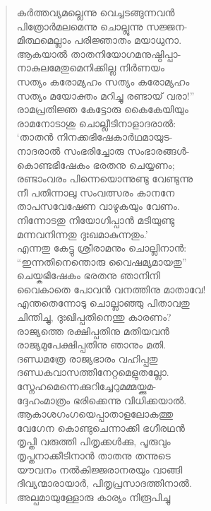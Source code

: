 \begin{verse}
കര്‍ത്തവ്യമല്ലെന്നു വെച്ചടങ്ങുന്നവന്‍\\
പിത്രോര്‍മലമെന്നു ചൊല്ലുന്നു സജ്ജന-\\
മിത്ഥമെല്ലാം പരിജ്ഞാതം മയാധുനാ.\\
ആകയാല്‍ താതനിയോഗമനുഷ്ഠിപ്പാ-\\
നാകുലമേതുമെനിക്കില്ല നിര്‍ണയം\\
സത്യം കരോമ്യഹം സത്യം കരോമ്യഹം\\
സത്യം മയോക്തം മറിച്ചു രണ്ടായ് വരാ!”\\
രാമപ്രതിജ്ഞ കേട്ടോരു കൈകേയിയും\\
രാമനോടാശു ചൊല്ലീടിനാളാദരാല്‍:\\
‘താതന്‍ നിനക്കഭിഷേകാര്‍ഥമായുട-\\
നാദരാല്‍ സംഭരിച്ചോരു സംഭാരങ്ങള്‍-\\
കൊണ്ടഭിഷേകം ഭരതനു ചെയ്യണം;\\
രണ്ടാംവരം പിന്നെയൊന്നുണ്ടു വേണ്ടുന്നു\\
നീ പതിന്നാലു സംവത്സരം കാനനേ\\
താപസവേഷേണ വാഴുകയും വേണം.\\
നിന്നോടതു നിയോഗിപ്പാന്‍ മടിയുണ്ടു\\
മന്നവനിന്നതു ദുഃഖമാകുന്നതും.’\\
എന്നതു കേട്ടു ശ്രീരാമനും ചൊല്ലിനാന്‍:\\
“ഇന്നതിനെന്തൊരു വൈഷമ്യമായതു”\\
ചെയ്കഭിഷേകം ഭരതനു ഞാനിനി\\
വൈകാതെ പോവന്‍ വനത്തിനു മാതാവേ!\\
എന്തതെന്നോടു ചൊല്ലാഞ്ഞു പിതാവതു\\
ചിന്തിച്ചു, ദുഃഖിപ്പതിനെന്തു കാരണം?\\
രാജ്യത്തെ രക്ഷിപ്പതിനു മതിയവന്‍\\
രാജ്യമുപേക്ഷിപ്പതിനു ഞാനും മതി.\\
ദണ്ഡമത്രേ രാജ്യഭാരം വഹിപ്പതു\\
ദണ്ഡകവാസത്തിനേറ്റമെളുതല്ലോ.\\
സ്നേഹമെന്നെക്കുറിച്ചേറുമമ്മയ്ക്കുമ-\\
ദ്ദേഹംമാത്രം ഭരിക്കെന്നു വിധിക്കയാല്‍.\\
ആകാശഗംഗയെപ്പാതാളലോകത്തു\\
വേഗേന കൊണ്ടുചെന്നാക്കി ഭഗീരഥന്‍\\
തൃപ്തി വരുത്തി പിതൃക്കള്‍ക്കു, പൂരുവും\\
തൃപ്തനാക്കീടിനാന്‍ താതനു തന്നുടെ\\
യൗവനം നല്‍കിജ്ജരാനരയും വാങ്ങി\\
ദിവ്യന്മാരായാര്‍, പിതൃപ്രസാദത്തിനാല്‍.\\
അല്പമായുള്ളോരു കാര്യം നിരൂപിച്ചു\\

\end{verse}
